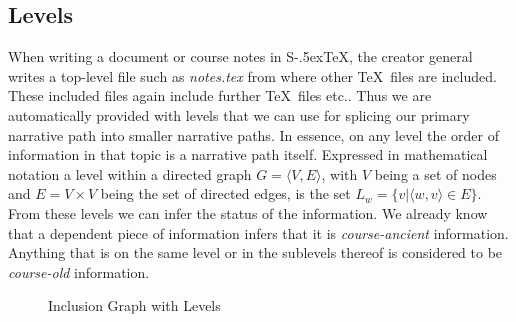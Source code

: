 \documentclass{llncs}
\def\stex{\texorpdfstring{\raisebox{-.5ex}S\kern-.5ex\TeX}{sTeX}\xspace}
\begin{document}
\begin{figure}
\vspace{-140pt}
\end{figure}

\subsection{Levels}
\label{sec:levels}

When writing a document or course notes in \stex, the creator general writes a top-level file such as \textit{notes.tex} from where other \TeX\ files are included. These included files again include further \TeX\ files etc.. Thus we are automatically provided with levels that we can use for splicing our primary narrative path into smaller narrative paths. In essence, on any level the order of information in that topic is a narrative path itself. Expressed in mathematical notation a level within a directed graph $G = \langle V, E \rangle $, with $V$ being a set of nodes and $E = V \times V$ being the set of directed edges, is the set $L_w = \lbrace v \vert \langle w, v \rangle \in E \rbrace$. From these levels we can infer the status of the information. We already know that a dependent piece of information infers that it is \textit{course-ancient} information. Anything that is on the same level or in the sublevels thereof is considered to be \textit{course-old} information.

\begin{figure}
\vspace{-12pt}
  \begin{center}
\vspace{-0pt}
  \caption{Inclusion Graph with Levels}
  \label{fig:levelsGraph}
\vspace{12pt}
  \end{center}
\end{figure}
\end{document}
